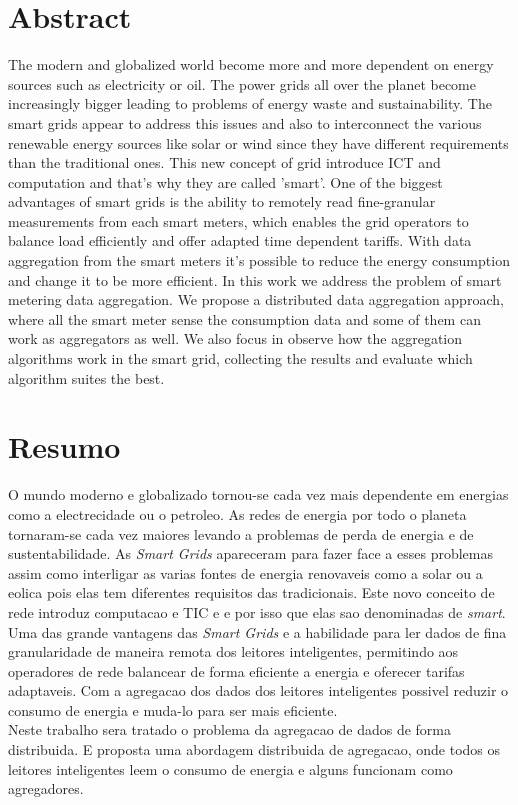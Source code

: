 \chapter*{Abstract}
	The modern and globalized world become more and more dependent on energy sources such as electricity or oil. The power grids all over the planet become increasingly bigger leading to problems of energy waste and sustainability. The smart grids appear to address this issues and also to interconnect the various renewable energy sources like solar or wind since they have different requirements than the traditional ones. This new concept of grid introduce ICT and computation  and that's why they are called 'smart'. One of the biggest advantages of smart grids is the ability to remotely read fine-granular measurements from each smart meters, which enables the grid operators to balance load efficiently and offer adapted time dependent tariffs. With data aggregation from the smart meters it's possible to reduce the energy consumption and change it to be more efficient.
In this work we address the problem of smart metering data aggregation. We propose a distributed data aggregation approach, where all the smart meter sense the consumption data and some of them can work as aggregators as well. We also focus in observe how the aggregation algorithms work in the smart grid, collecting the results and evaluate which algorithm suites the best.

	\cleardoublepage

\chapter*{Resumo}
	O mundo moderno e globalizado tornou-se cada vez mais dependente em energias como a electrecidade ou o petroleo. As redes de energia por todo o planeta tornaram-se cada vez maiores levando a problemas de perda de energia e de sustentabilidade. As \textit{Smart Grids} apareceram para fazer face a esses problemas assim como interligar as varias fontes de energia renovaveis como a solar ou a eolica pois elas tem diferentes requisitos das tradicionais. Este novo conceito de rede introduz computacao e TIC e e por isso que elas sao denominadas de \textit{smart}. Uma das grande vantagens das \textit{Smart Grids} e a habilidade para ler dados de fina granularidade de maneira remota dos leitores inteligentes, permitindo aos operadores de rede balancear de forma eficiente a energia e oferecer tarifas adaptaveis. Com a agregacao dos dados dos  leitores inteligentes  possivel reduzir o consumo de energia e muda-lo para ser mais eficiente.\\
Neste trabalho sera tratado o problema da agregacao de dados de forma distribuida.  E proposta uma abordagem distribuida de agregacao, onde todos os leitores inteligentes leem o consumo de energia e alguns funcionam como agregadores.